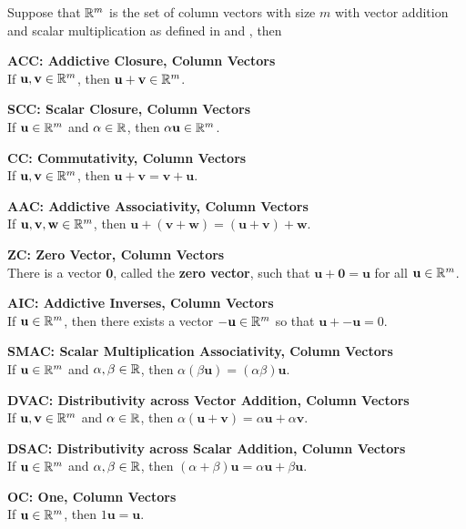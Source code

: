 \documentclass[a4paper,12pt]{article}
\begin{document}
\begin{pst}
  Suppose that $\mathbb{R}^{m}$ is the set of column vectors with size $m$ with vector addition and scalar multiplication as defined in \rdft[\sctd{2}] and \rdft[\sctd{1}], then

  \begin{alist}
    \item \textbf{ACC: Addictive Closure, Column Vectors}\\
    If $\mathbf{u},\mathbf{v}\in\mathbb{R}^{m}$, then $\mathbf{u}+\mathbf{v}\in\mathbb{R}^{m}$.
    \item \textbf{SCC: Scalar Closure, Column Vectors}\\
    If $\mathbf{u}\in\mathbb{R}^{m}$ and $\alpha\in\mathbb{R}$, then $\alpha\mathbf{u}\in\mathbb{R}^{m}$.
    \item \textbf{CC: Commutativity, Column Vectors}\\
    If $\mathbf{u},\mathbf{v}\in\mathbb{R}^{m}$, then $\mathbf{u}+\mathbf{v}=\mathbf{v}+\mathbf{u}$.
    \item \textbf{AAC: Addictive Associativity, Column Vectors}\\
    If $\mathbf{u},\mathbf{v},\mathbf{w}\in\mathbb{R}^{m}$, then $\mathbf{u}+(\mathbf{v}+\mathbf{w})=(\mathbf{u}+\mathbf{v})+\mathbf{w}$.
    \item \textbf{ZC: Zero Vector, Column Vectors}\\
    There is a vector $\mathbf{0}$, called the \textbf{zero vector}, such that $\mathbf{u}+\mathbf{0}=\mathbf{u}$ for all $\mathbf{u}\in\mathbb{R}^{m}$.
    \item \textbf{AIC: Addictive Inverses, Column Vectors}\\
    If $\mathbf{u}\in\mathbb{R}^{m}$, then there exists a vector $-\mathbf{u}\in\mathbb{R}^{m}$ so that $\mathbf{u}+\mathbf{-u}=0$.
    \item \textbf{SMAC: Scalar Multiplication Associativity, Column Vectors}\\
    If $\mathbf{u}\in\mathbb{R}^{m}$ and $\alpha,\beta\in\mathbb{R}$, then $\alpha(\beta\mathbf{u})=(\alpha\beta)\mathbf{u}$.
    \item \textbf{DVAC: Distributivity across Vector Addition, Column Vectors}\\
    If $\mathbf{u},\mathbf{v}\in\mathbb{R}^{m}$ and $\alpha\in\mathbb{R}$, then $\alpha(\mathbf{u}+\mathbf{v})=\alpha\mathbf{u}+\alpha\mathbf{v}$.
    \item \textbf{DSAC: Distributivity across Scalar Addition, Column Vectors}\\
    If $\mathbf{u}\in\mathbb{R}^{m}$ and $\alpha,\beta\in\mathbb{R}$, then $(\alpha+\beta)\mathbf{u}=\alpha\mathbf{u}+\beta\mathbf{u}$.
    \item \textbf{OC: One, Column Vectors}\\
    If $\mathbf{u}\in\mathbb{R}^{m}$, then $1\mathbf{u}=\mathbf{u}$.
  \end{alist}
\end{pst}
\end{document}
